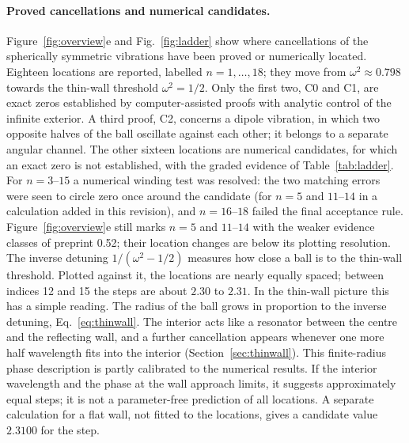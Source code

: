 \paragraph{Proved cancellations and numerical candidates.}
Figure~\ref{fig:overview}e and Fig.~\ref{fig:ladder} show where
cancellations of the spherically symmetric vibrations have been proved
or numerically located. Eighteen locations are reported, labelled
$n=1,\ldots,18$; they move from $\omega^2\approx0.798$ towards the
thin-wall threshold $\omega^2=1/2$. Only the first two, C0 and C1, are
exact zeros established by computer-assisted proofs with analytic control
of the infinite exterior. A third proof, C2, concerns a dipole vibration,
in which two opposite halves of the ball oscillate against each other;
it belongs to a separate angular channel. The other sixteen locations
are numerical candidates, for which an exact zero is not established,
with the graded evidence of Table~\ref{tab:ladder}. For $n=3$--$15$ a
numerical winding test was resolved: the two matching errors were seen
to circle zero once around the candidate (for $n=5$ and $11$--$14$ in a
calculation added in this revision), and $n=16$--$18$ failed the final
acceptance rule. Figure~\ref{fig:overview}e still marks $n=5$ and
$11$--$14$ with the weaker evidence classes of preprint 0.52; their
location changes are below its plotting resolution. The inverse detuning $1/(\omega^2-1/2)$ measures how
close a ball is to the thin-wall threshold. Plotted against it, the
locations are nearly equally spaced; between indices 12 and 15 the steps
are about $2.30$ to $2.31$. In the thin-wall picture this has a simple
reading. The radius of the ball grows in proportion to the inverse
detuning, Eq.~\eqref{eq:thinwall}. The interior acts like a resonator
between the centre and the reflecting wall, and a further cancellation
appears whenever one more half wavelength fits into the interior
(Section~\ref{sec:thinwall}). This finite-radius phase description is
partly calibrated to the numerical results. If the interior wavelength
and the phase at the wall approach limits, it suggests approximately
equal steps; it is not a parameter-free prediction of all locations.
A separate calculation for a flat wall, not fitted to the locations,
gives a candidate value $2.3100$ for the step.

